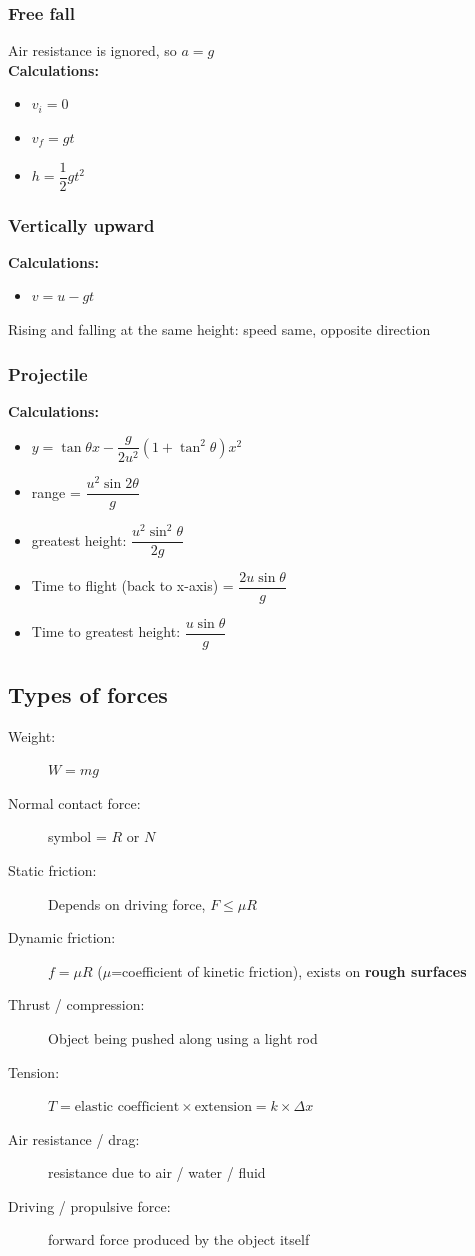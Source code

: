 \documentclass[A4paper, 11pt]{article}
\begin{document}
	\subsubsection{Free fall}
	Air resistance is ignored, so $a=g$\\
	\textbf{Calculations:}
	\begin{itemize}
		\item $v_i = 0$
		\item $v_f = gt$
		\item $h=\dfrac{1}{2}gt^2$
	\end{itemize}
	\subsubsection{Vertically upward}
	\textbf{Calculations:}
	\begin{itemize}
		\item $v = u - gt$
	\end{itemize}
	Rising and falling at the same height: speed same, opposite direction
	\subsubsection{Projectile}
	\textbf{Calculations:}
	\begin{itemize}
		\item $y=\tan\theta x - \dfrac{g}{2u^2}(1+\tan^2\theta)x^2$
		\item range = $\dfrac{u^2\sin 2\theta}{g}$
		\item greatest height: $\dfrac{u^2\sin^2\theta}{2g}$
		\item Time to flight (back to x-axis) = $\dfrac{2u\sin\theta}{g}$
		\item Time to greatest height: $\dfrac{u\sin\theta}{g}$
	\end{itemize}
	\subsection{Types of forces}
	\begin{description}
		\item[Weight:] $W=mg$
		\item[Normal contact force:] symbol = $R$ or $N$
		\item[Static friction:] Depends on driving force, $F\leq \mu R$
		\item[Dynamic friction:] $f=\mu R$ ($\mu$=coefficient of kinetic friction), exists on \textbf{rough surfaces}
		\item[Thrust / compression:] Object being pushed along using a light rod
		\item[Tension:] $T=\text{elastic coefficient}\times\text{extension}=k\times\Delta x$
		\item[Air resistance / drag:] resistance due to air / water / fluid
		\item[Driving / propulsive force:] forward force produced by the object itself
	\end{description}
	
\end{document}
